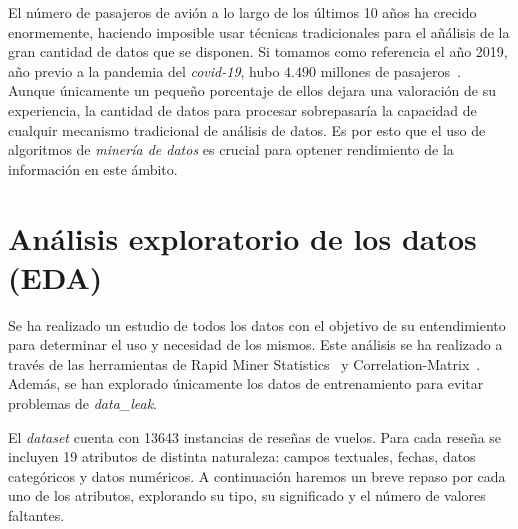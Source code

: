 \documentclass[es]{uc3mreport}
\begin{document}
\begin{report}
El número de pasajeros de avión a lo largo de los últimos 10 años ha crecido enormemente, haciendo imposible usar técnicas tradicionales para el añálisis de la gran cantidad de datos que se disponen. Si tomamos como referencia el año 2019, año previo a la pandemia del \textit{covid-19}, hubo $4.490$ millones de pasajeros~\cite{owd-passengers}. Aunque únicamente un pequeño porcentaje de ellos dejara una valoración de su experiencia, la cantidad de datos para procesar sobrepasaría la capacidad de cualquir mecanismo tradicional de análisis de datos. Es por esto que el uso de algoritmos de \textit{minería de datos} es crucial para optener rendimiento de la información en este ámbito.




\section{Análisis exploratorio de los datos (EDA)}
\label{chap:eda}
Se ha realizado un estudio de todos los datos con el objetivo de su entendimiento para determinar el uso y necesidad de los mismos. Este análisis se ha realizado a través de las herramientas de Rapid Miner Statistics~\cite{Statistics-RM} y Correlation-Matrix~\cite{Correlation-Matrix-RM}. Además, se han explorado únicamente los datos de entrenamiento para evitar problemas de \textit{data\_leak}. 

El \textit{dataset} cuenta con 13643 instancias de reseñas de vuelos. Para cada reseña se incluyen 19 atributos de distinta naturaleza: campos textuales, fechas, datos categóricos y datos numéricos. A continuación haremos un breve repaso por cada uno de los atributos, explorando su tipo, su significado y el número de valores faltantes.


\end{report}
\end{document}
